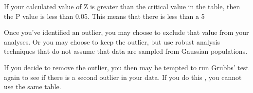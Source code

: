 If your calculated value of Z is greater than the critical value in the table, then the P value is less than 0.05. This means that there is less than a 5%

Once you've identified an outlier, you may choose to exclude that value from your analyses. Or you may choose to keep the outlier, but use robust analysis techniques that do not assume that data are sampled from Gaussian populations.

If you decide to remove the outlier, you then may be tempted to run Grubbs' test again to see if there is a second outlier in your data. If you do this , you cannot use the same table.

